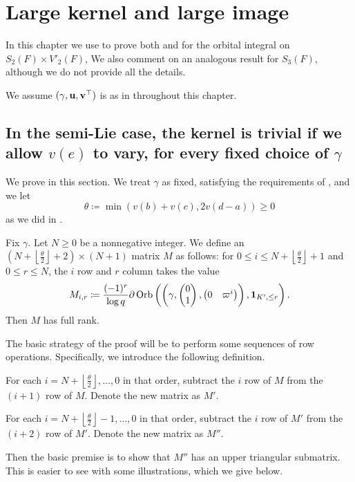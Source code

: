 \section{Large kernel and large image}
\label{ch:ker}

In this chapter we use  to prove
both  and 
for the orbital integral on $S_2(F) \times V'_2(F)$,
We also comment on an analogous result for $S_3(F)$,
although we do not provide all the details.

We assume ${(\gamma, \mathbf u, \mathbf v^\top)}$ is as in  throughout this chapter.

\subsection{In the semi-Lie case, the kernel is trivial if we allow $v(e)$ to vary, for every fixed choice of $\gamma$}
We prove  in this section.
We treat $\gamma$ as fixed, satisfying the requirements of ,
and we let
\[ \theta \coloneqq \min\left( v(b)+v(c), 2v(d-a) \right) \ge 0 \]
as we did in .

\begin{lemma}
  \label{lem:semi_lie_ker_full_rank}
  Fix $\gamma$. Let $N \ge 0$ be a nonnegative integer.
  We define an $(N+ \left\lfloor \frac{\theta}{2} \right\rfloor + 2) \times (N+1)$ matrix $M$ as follows:
  for $0 \le i \le N+ \left\lfloor \frac{\theta}{2} \right\rfloor + 1$ and $0 \le r \le N$,
  the $i$ row and $r$ column takes the value
  \[
    M_{i,r} \coloneqq \frac{(-1)^r}{\log q} \partial \operatorname{Orb}\left(
      \left(\gamma, \begin{pmatrix} 0 \\ 1 \end{pmatrix}, \begin{pmatrix} 0 & \varpi^i \end{pmatrix} \right),
      \mathbf{1}_{K', \le r} \right).
  \]
  Then $M$ has full rank.
\end{lemma}
The basic strategy of the proof will be to perform some sequences of row operations.
Specifically, we introduce the following definition.
\begin{itemize}
  \ii For each $i = N + \left\lfloor \frac{\theta}{2} \right\rfloor,\dots,0$ in that order,
  subtract the $i$ row of $M$
  from the $(i+1)$ row of $M$.
  Denote the new matrix as $M'$.

  \ii For each $i = N + \left\lfloor \frac{\theta}{2} \right\rfloor - 1,\dots,0$ in that order,
  subtract the $i$ row of $M'$
  from the $(i+2)$ row of $M'$.
  Denote the new matrix as $M''$.
\end{itemize}
Then the basic premise is to show that $M''$ has an upper triangular submatrix.
This is easier to see with some illustrations, which we give below.

